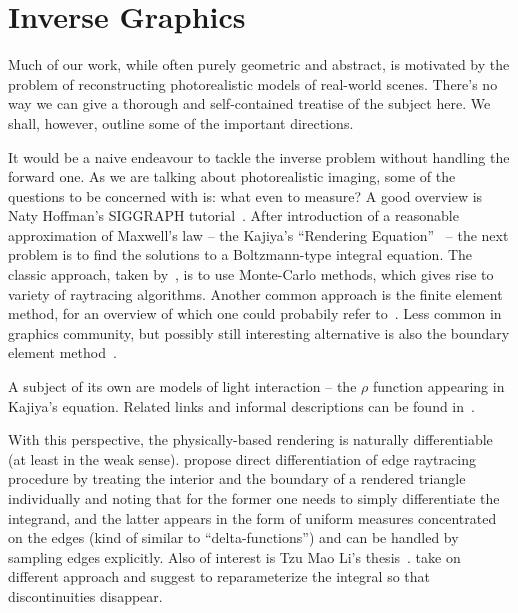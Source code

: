 \chapter{Inverse Graphics} \label{chap:graphics}

Much of our work, while often purely geometric and abstract, is motivated by
the problem of reconstructing photorealistic models of real-world scenes.
There's no way we can give a thorough and self-contained treatise of the subject
here. We shall, however, outline some of the important directions.

It would be a naive endeavour to tackle the inverse problem without handling
the forward one. As we are talking about photorealistic imaging, some of the
questions to be concerned with is: what even to measure?  A good overview is
Naty Hoffman's SIGGRAPH tutorial~\cite{natyHoffmanPBS}. After introduction of a
reasonable approximation of Maxwell's law -- the Kajiya's ``Rendering
Equation''~\cite{kajiya1986rendering} -- the next problem is to find the
solutions to a Boltzmann-type integral equation.
The classic approach, taken by~\cite{kajiya1986rendering},
is to use Monte-Carlo methods, which gives rise to variety of raytracing algorithms.
Another common approach is the finite element method, for an overview of which
one could probabily refer to~\cite{lehtinen2004foundations}. Less common in
graphics community, but possibly still interesting alternative is also the boundary element
method~\cite{zhang2013fast}.

A subject of its own are models of light interaction -- the \( \rho \) function
appearing in Kajiya's equation. Related links and informal descriptions
can be found
in~\cite{hackmdRendering,hackmd3d,hackmdBeyondLambert,hackmdBlinn,hackmdDRM,hackmdTorranceSparrow,hackmdPhong}.

With this perspective, the physically-based rendering is naturally
differentiable (at least in the weak sense). \citet{tzuMaoEdgesampling} propose
direct differentiation of edge raytracing procedure by treating the interior
and the boundary of a rendered triangle individually and noting that for the
former one needs to simply differentiate the integrand, and the latter appears
in the form of uniform measures concentrated on the edges (kind of similar to
``delta-functions'') and can be handled by sampling edges explicitly.
Also of interest is Tzu Mao Li's thesis~\cite{tzuMaoThesis}.
\citet{mitsuba2,mitsuba2Math} take on different approach and suggest to
reparameterize the integral so that discontinuities disappear.

